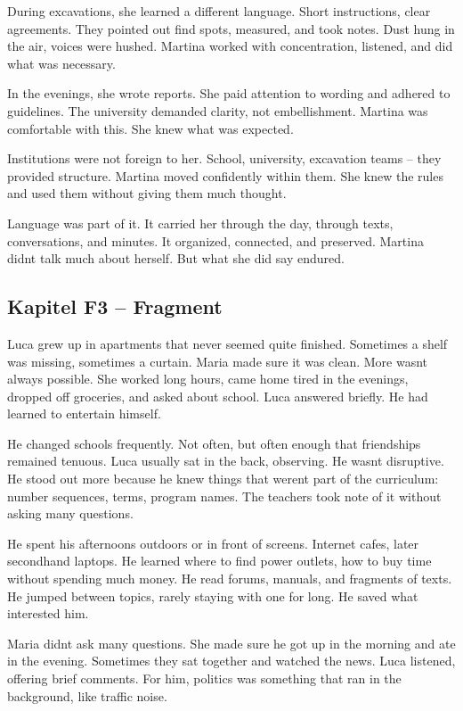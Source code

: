 \documentclass[
]{article}
\begin{document}
During excavations, she learned a different language. Short instructions, clear agreements. They pointed out find spots, measured, and took notes. Dust hung in the air, voices were hushed. Martina worked with concentration, listened, and did what was necessary.

In the evenings, she wrote reports. She paid attention to wording and adhered to guidelines. The university demanded clarity, not embellishment. Martina was comfortable with this. She knew what was expected.

Institutions were not foreign to her. School, university, excavation teams -- they provided structure. Martina moved confidently within them. She knew the rules and used them without giving them much thought.

Language was part of it. It carried her through the day, through texts, conversations, and minutes. It organized, connected, and preserved. Martina didn\textquotesingle t talk much about herself. But what she did say endured.

\subsection{Kapitel F3 -- Fragment}\label{kapitel-f3-fragment}

Luca grew up in apartments that never seemed quite finished. Sometimes a shelf was missing, sometimes a curtain. Maria made sure it was clean. More wasn\textquotesingle t always possible. She worked long hours, came home tired in the evenings, dropped off groceries, and asked about school. Luca answered briefly. He had learned to entertain himself.

He changed schools frequently. Not often, but often enough that friendships remained tenuous. Luca usually sat in the back, observing. He wasn\textquotesingle t disruptive. He stood out more because he knew things that weren\textquotesingle t part of the curriculum: number sequences, terms, program names. The teachers took note of it without asking many questions.

He spent his afternoons outdoors or in front of screens. Internet cafes, later secondhand laptops. He learned where to find power outlets, how to buy time without spending much money. He read forums, manuals, and fragments of texts. He jumped between topics, rarely staying with one for long. He saved what interested him.

Maria didn\textquotesingle t ask many questions. She made sure he got up in the morning and ate in the evening. Sometimes they sat together and watched the news. Luca listened, offering brief comments. For him, politics was something that ran in the background, like traffic noise.
\end{document}
